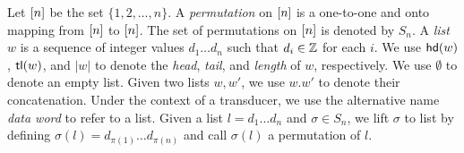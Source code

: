 Let $[n]$ be the set $\{ 1, 2, \ldots, n \}$. A \emph{permutation} on
$[n]$ is a one-to-one and onto mapping from $[n]$ to
$[n]$. The set of
permutations on $[n]$ is denoted by $S_n$.
A \emph{list $w$} is a sequence of integer values $d_1\ldots d_n$ such that $d_i \in {\mathbb{Z} }$ for each $i$.
We use $\mathsf{hd}(w)$, $\mathsf{tl}(w)$, and $|w|$ to denote the \emph{head}, \emph{tail}, and \emph{length} of $w$, respectively.
We use $\emptyset$ to denote an empty list.
Given two lists $w,w'$, we use $w.w'$ to denote their concatenation.
Under the context of a transducer, we use the alternative name \emph{data word} to refer to a list.
Given a list $l=d_1\ldots d_n$ and $\sigma \in S_n$, we lift $\sigma$ to list by defining $\sigma(l)=d_{\pi(1)} \ldots d_{\pi(n)}$ and call $\sigma(l)$ a permutation of $l$.